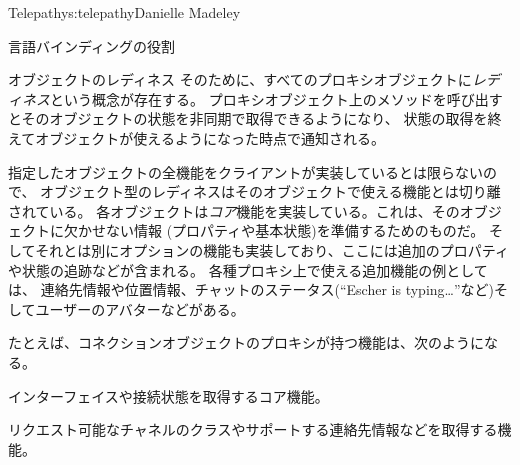 \begin{aosachapter}{Telepathy}{s:telepathy}{Danielle Madeley}
\begin{aosasect1}{言語バインディングの役割}
\begin{aosasect2}{オブジェクトのレディネス}
そのために、すべてのプロキシオブジェクトに\emph{レディネス}という概念が存在する。
プロキシオブジェクト上のメソッドを呼び出すとそのオブジェクトの状態を非同期で取得できるようになり、
状態の取得を終えてオブジェクトが使えるようになった時点で通知される。

指定したオブジェクトの全機能をクライアントが実装しているとは限らないので、
オブジェクト型のレディネスはそのオブジェクトで使える機能とは切り離されている。
各オブジェクトは\emph{コア}機能を実装している。これは、そのオブジェクトに欠かせない情報
(プロパティや基本状態)を準備するためのものだ。
そしてそれとは別にオプションの機能も実装しており、ここには追加のプロパティや状態の追跡などが含まれる。
各種プロキシ上で使える追加機能の例としては、
連絡先情報や位置情報、チャットのステータス(``Escher is typing{\ldots}''など)そしてユーザーのアバターなどがある。

たとえば、コネクションオブジェクトのプロキシが持つ機能は、次のようになる。

\begin{aosaitemize}

  \item インターフェイスや接続状態を取得するコア機能。

  \item リクエスト可能なチャネルのクラスやサポートする連絡先情報などを取得する機能。


\end{aosaitemize}
\end{aosasect2}
\end{aosasect1}
\end{aosachapter}
